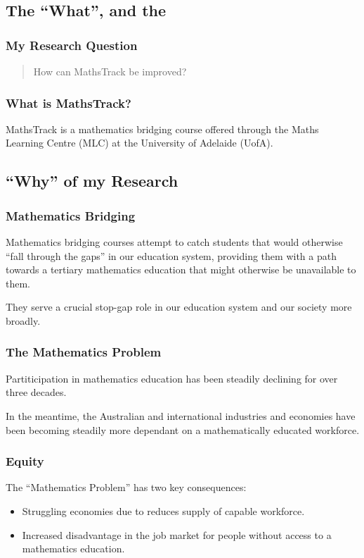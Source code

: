 \documentclass[14pt]{beamer}
\begin{document}
\subsection{The ``What'', and the}

\begin{frame}
\frametitle{My Research Question}
\begin{quote}
	How can MathsTrack be improved?
\end{quote}
\end{frame}

\begin{frame}
\frametitle{What is MathsTrack?}
MathsTrack is a mathematics bridging course offered through the Maths Learning Centre (MLC) at the University of Adelaide (UofA).
\end{frame}

\subsection{``Why'' of my Research}

\begin{frame}
\frametitle{Mathematics Bridging}
Mathematics bridging courses attempt to catch students that would otherwise ``fall through the gaps'' in our education system, providing them with a path towards a tertiary mathematics education that might otherwise be unavailable to them.

They serve a crucial stop-gap role in our education system and our society more broadly.
\end{frame}

\begin{frame}
\frametitle{The Mathematics Problem}
Partiticipation in mathematics education has been steadily declining for over three decades.

In the meantime, the Australian and international industries and economies have been becoming steadily more dependant on a mathematically educated workforce.
\end{frame}

\begin{frame}
\frametitle{Equity}
The ``Mathematics Problem'' has two key consequences:
\begin{itemize}
	\item Struggling economies due to reduces supply of capable workforce.
	\item Increased disadvantage in the job market for people without access to a mathematics education.
\end{itemize}
\end{frame}
\end{document}

